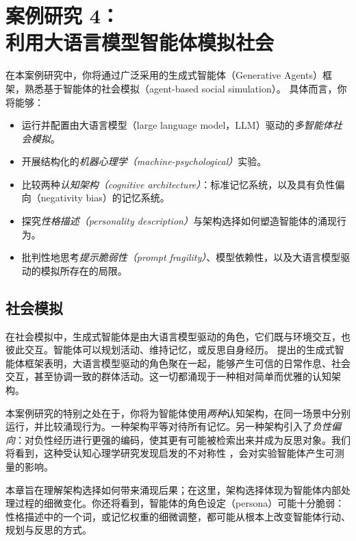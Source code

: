 \chapter[案例研究 4：社会模拟]{案例研究 4：\\利用大语言模型智能体模拟社会}\label{chap:generative_agents}


\begin{learningbox}

在本案例研究中，你将通过广泛采用的生成式智能体（Generative Agents）框架，熟悉基于智能体的社会模拟（agent-based social simulation）\citep{park2023generative}。
具体而言，你将能够：

\begin{itemize}[leftmargin=*, nosep]
    \item 运行并配置由大语言模型（large language model，LLM）驱动的{\em 多智能体社会模拟}。
    \item 开展结构化的{\em 机器心理学（machine-psychological）}实验。
    \item 比较两种{\em 认知架构（cognitive architecture）}：标准记忆系统，以及具有负性偏向（negativity bias）的记忆系统。
    \item 探究{\em 性格描述（personality description）}与架构选择如何塑造智能体的涌现行为。
    \item 批判性地思考{\em 提示脆弱性（prompt fragility）}、模型依赖性，以及大语言模型驱动的模拟所存在的局限。
\end{itemize}

\end{learningbox}


\section{社会模拟}
在社会模拟中，生成式智能体是由大语言模型驱动的角色，它们既与环境交互，也彼此交互。智能体可以规划活动、维持记忆，或反思自身经历。\citet{park2023generative} 提出的生成式智能体框架表明，大语言模型驱动的角色聚在一起，能够产生可信的日常作息、社会交互，甚至协调一致的群体活动。这一切都涌现于一种相对简单而优雅的认知架构。

本案例研究的特别之处在于，你将为智能体使用\emph{两种}认知架构，在同一场景中分别运行，并比较涌现行为。一种架构平等对待所有记忆。另一种架构引入了\emph{负性偏向}：对负性经历进行更强的编码，使其更有可能被检索出来并成为反思对象。我们将看到，这种受认知心理学研究发现启发的不对称性 \citep{baumeister2001bad}，会对实验智能体产生可测量的影响。


本章旨在理解架构选择如何带来涌现后果；在这里，架构选择体现为智能体内部处理过程的细微变化。你还将看到，智能体的角色设定（persona）可能十分脆弱：性格描述中的一个词，或记忆权重的细微调整，都可能从根本上改变智能体行动、规划与反思的方式。

